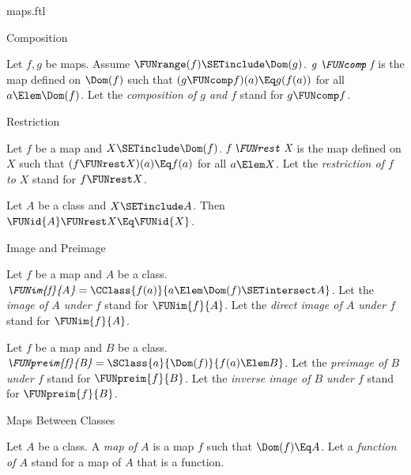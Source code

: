 \documentclass{stex}
\begin{document}
\begin{smodule}{maps.ftl}
\begin{sfragment}{Composition}
  \begin{definition}[forthel,for=composition]
    Let $f, g$ be maps.
    Assume $\FUNrange(f) \SETinclude \Dom(g)$.
    $\emph{g \FUNcomp f}$ is the map defined on $\Dom(f)$ such that $(g \FUNcomp f)(a) \Eq g(f(a))$ for all $a \Elem \Dom(f)$.
    Let the \emph{composition of $g$ and $f$} stand for $g \FUNcomp f$.
  \end{definition}
\end{sfragment}

\begin{sfragment}{Restriction}
  \begin{definition}[forthel,for=restriction]
    Let $f$ be a map and $X \SETinclude \Dom(f)$.
    $\emph{f \FUNrest X}$ is the map defined on $X$ such that $(f \FUNrest X)(a) \Eq f(a)$ for all $a \Elem X$.
    Let the \emph{restriction of $f$ to $X$} stand for $f \FUNrest X$.
  \end{definition}

  \begin{proposition}[forthel]
    Let $A$ be a class and $X \SETinclude A$.
    Then $\FUNid{A} \FUNrest X \Eq \FUNid{X}$.
  \end{proposition}
\end{sfragment}

\begin{sfragment}{Image and Preimage}
  \begin{definition}[forthel,for={FUNim,image,direct image}]
    Let $f$ be a map and $A$ be a class.
    $\emph{\FUNim{f}{A}} = \CClass{f(a)}{a \Elem \Dom(f) \SETintersect A}$.
    Let the \emph{image of $A$ under $f$} stand for $\FUNim{f}{A}$.
    Let the \emph{direct image of $A$ under $f$} stand for $\FUNim{f}{A}$.
  \end{definition}

  \begin{definition}[forthel,for={preimage,inverse image}]
    Let $f$ be a map and $B$ be a class.
    $\emph{\FUNpreim{f}{B}} = \SClass{a}{\Dom(f)}{f(a) \Elem B}$.
    Let the \emph{preimage of $B$ under $f$} stand for $\FUNpreim{f}{B}$.
    Let the \emph{inverse image of $B$ under $f$} stand for $\FUNpreim{f}{B}$.
  \end{definition}
\end{sfragment}

\begin{sfragment}{Maps Between Classes}
  \begin{definition}[forthel,for={map,function}]
    Let $A$ be a class.
    A \emph{map of $A$} is a map $f$ such that $\Dom(f) \Eq A$.
    Let a \emph{function of $A$} stand for a map of $A$ that is a function.
  \end{definition}


\end{sfragment}
\end{smodule}
\end{document}
